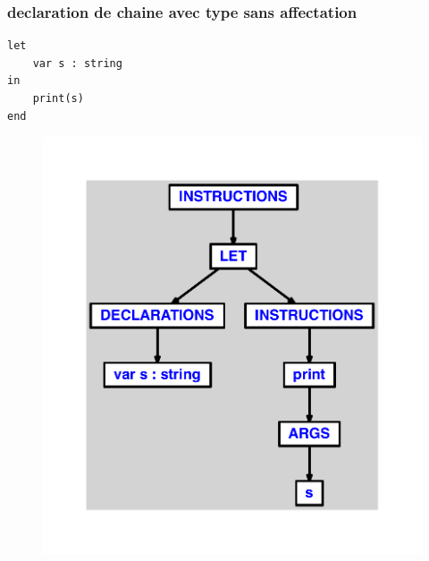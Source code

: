 \documentclass{article}
\begin{document}
\subsubsection{declaration de chaine avec type sans affectation}
\begin{lstlisting}
let
	var s : string
in
	print(s)
end
\end{lstlisting}
\newpage
\begin{figure}[H]
\centering
\includegraphics[max width=\textwidth]{ast/ast_290.pdf}
\end{figure}
\newpage
\end{document}
